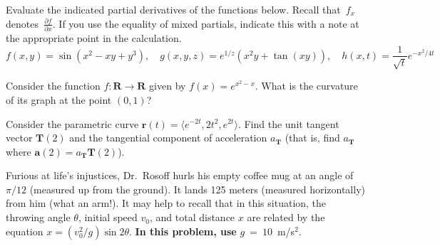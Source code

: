 \documentclass[12pt]{exam}
\newcommand{\R}{\mathbf{R}}
\begin{document}
\begin{questions}
\pointsinmargin

\question Evaluate the indicated partial derivatives of the functions below. Recall that~$f_x$ denotes~$\frac{\partial f}{\partial x}$. If you use the equality of mixed partials, indicate this with a note at the appropriate point in the calculation.
\[
    f(x,y) = \sin(x^2-xy+y^3), \quad g(x,y,z) = e^{1/z} (x^2 y + \tan(xy)), \quad h(x,t) = \frac{1}{\sqrt{t}} e^{-x^2/4t}
\]
\newpage

\question[12] Consider the function $f \colon \R \to \R$ given by $f(x) = e^{x^2-x}$. What is the curvature of its graph at the point $(0,1)$?


\question[12] Consider the parametric curve $\mathbf{r}(t) = \langle e^{-2t},2t^2,e^{2t} \rangle$. Find the unit tangent vector $\mathbf{T}(2)$ and the tangential component of acceleration $a_{\mathbf{T}}$ (that is, find $a_{\mathbf{T}}$ where $\mathbf{a}(2) = a_{\mathbf{T}} \mathbf{T}(2)$).


\newpage

\question Furious at life's injustices, Dr.\ Rosoff hurls his empty coffee mug at an angle of $\pi/12$ (measured up from the ground). It lands 125 meters (measured horizontally) from him (what an arm!). It may help to recall that in this situation, the throwing angle $\theta$, initial speed $v_0$, and total distance $x$ are related by the equation $x = (v_0^2/g) \sin 2\theta$. \textbf{In this problem, use} $g~=~10$~m/s$^2$.


\end{questions}
\end{document}
